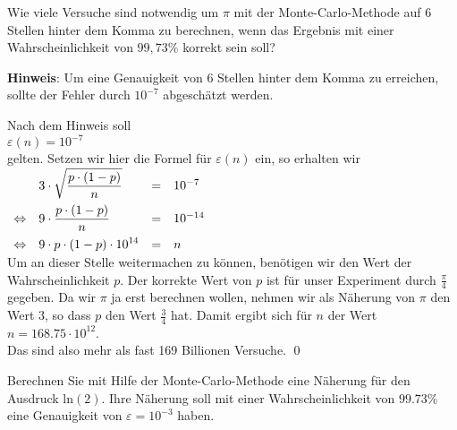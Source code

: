 \vspace*{0.3cm}

\exercise
Wie viele Versuche sind notwendig um $\pi$ mit der Monte-Carlo-Methode auf 6
Stellen hinter dem Komma zu berechnen, wenn das Ergebnis mit einer Wahr\-scheinlichkeit von $99,73\%$
korrekt sein soll?
\vspace*{0.1cm}

\noindent
\textbf{Hinweis}: 
Um eine Genauigkeit von 6 Stellen hinter dem Komma zu erreichen, sollte der Fehler durch $10^{-7}$
abgesch\"atzt werden.  \eox
\pagebreak

\solution
Nach dem Hinweis soll 
\\[0.2cm]
\hspace*{1.3cm}
$\varepsilon(n) = 10^{-7}$
\\[0.2cm]
gelten. Setzen wir hier die Formel f\"ur $\varepsilon(n)$ ein, so erhalten wir
\\[0.2cm]
\hspace*{1.3cm}
$  
\begin{array}[t]{llcl}
                & \displaystyle 3 \cdot \sqrt{\frac{p \cdot (1 - p)}{n}} & = & 10^{-7}   \\[0.3cm]
\Leftrightarrow & \displaystyle 9 \cdot        \frac{p \cdot (1 - p)}{n} & = & 10^{-14}      \\[0.3cm]
\Leftrightarrow & \displaystyle 9 \cdot    p \cdot (1 - p) \cdot 10^{14} & = & n 
\end{array}
$
\\[0.2cm] 
Um an dieser Stelle weitermachen zu k\"onnen, ben\"otigen wir den Wert der Wahr\-scheinlichkeit $p$.  Der korrekte
Wert von $p$ ist f\"ur unser Experiment durch $\frac{\pi}{4}$ gegeben.  Da wir $\pi$ ja erst berechnen wollen,
nehmen wir als N\"aherung von $\pi$ den Wert $3$, so dass $p$ den Wert $\frac{3}{4}$ hat.  Damit
ergibt sich f\"ur $n$ der Wert
\\[0.2cm]
\hspace*{1.3cm}
$n = 168.75 \cdot 10^{12}$.
\\[0.2cm]
Das sind also mehr als fast 169 Billionen Versuche. \qed


\exercise
Berechnen Sie mit Hilfe der Monte-Carlo-Methode eine N\"aherung f\"ur den Ausdruck $\mathrm{ln}(2)$.
Ihre N\"aherung soll mit einer Wahrscheinlichkeit von $99.73\%$ eine Genauigkeit von 
$\varepsilon = 10^{-3}$ haben. \eox


